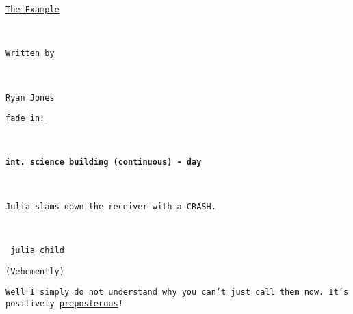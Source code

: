 \documentclass{article}
\newcommand{\titleofscript}[2]{
    \vspace*{\fill}
        \begingroup
        \centering
        \texttt{\underline{#1}}
            
            \
            
            \texttt{Written by}
            
            \
            
            \texttt{#2}
            
        \endgroup
    \vspace*{\fill}
    
    \pagebreak
    
}
\newcommand{\transition}[1]{

    \MakeUppercase{\underline{\texttt{#1}}}
    
    \
    
}
\newcommand{\sceneheading}[1]{
    
    \MakeUppercase{\textbf{\texttt{#1}}}
    
    \
    
}
\newcommand{\action}[1]{

    \texttt{#1}
    
    \
    
}
\newcommand{\character}[1]{

    \centering 
    \MakeUppercase{
        \texttt{
            #1 %
        }
    }
    
}
\newcommand{\parenthetical}[1]{

    \centering
    \texttt{(#1)}
    
}
\newcommand{\dialogue}[1]{

    \centering
    \parbox{0.45\textwidth}{
        \texttt{#1}
    }
    
    \
    
}
\begin{document}
\titleofscript{The Example}{Ryan Jones}

\transition{fade in:}
\sceneheading{int. science building (continuous) - day}
\action{Julia slams down the receiver with a CRASH.}
\character{julia child}
\parenthetical{Vehemently}
\dialogue{Well I simply do not understand why you can't just call them now. It's positively \underline{preposterous}!}
\end{document}
